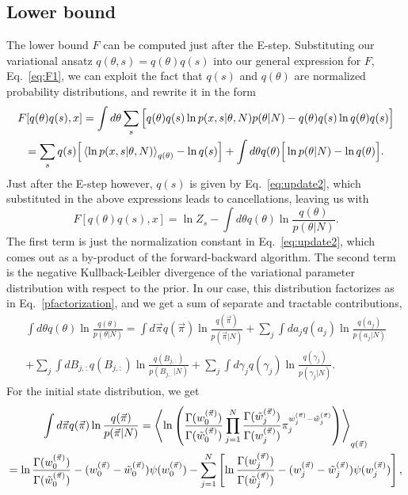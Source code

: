\subsection{Lower bound}
The lower bound $F$ can be computed just after the
E-step. Substituting our variational ansatz
$q(\theta,s)=q(\theta)q(s)$ into our general expression for $F$,
Eq.~\eqref{eq:F1}, we can exploit the fact that $q(s)$ and $q(\theta)$
are normalized probability distributions, and rewrite it in the form
\begin{multline}
F[q(\theta)q(s),x]=\int d\theta\sum_s \Big[ q(\theta)q(s) \ln
    p(x,s|\theta,N)p(\theta|N) -q(\theta)q(s) \ln q(\theta)q(s) \Big]\\
=\sum_sq(s)\Big[\left\langle \ln p(x,s|\theta,N)\right\rangle_{q(\theta)} -\ln q(s)\Big]
+\int d\theta q(\theta)\Big[\ln p(\theta|N)-\ln q(\theta)\Big].
\end{multline}
Just after the E-step however, $q(s)$ is given by
Eq.~\eqref{eq:update2}, which substituted in the above expressions
leads to cancellations, leaving us with
\begin{equation}
F[q(\theta)q(s),x]=\ln Z_s-\int d\theta q(\theta)\ln\frac{q(\theta)}{p(\theta|N)}.
\end{equation}
The first term is just the normalization constant in
Eq.~\eqref{eq:update2}, which comes out as a by-product of the
forward-backward algorithm. The second term is the negative
Kullback-Leibler divergence of the variational parameter distribution
with respect to the prior. In our case, this distribution factorizes
as in Eq.~\eqref{pfactorization}, and we get a sum of separate and
tractable contributions,
\begin{multline}
\int d\theta q(\theta)\ln\frac{q(\theta)}{p(\theta|N)}
     =\int d\vec\pi q(\vec\pi)\ln\frac{q(\vec\pi)}{p(\vec\pi|N)}
     +\sum_j\int da_j q(a_j)\ln\frac{q(a_j)}{p(a_j|N)}\\
     +\sum_j\int dB_{j,:} q(B_{j,:})\ln\frac{q(B_{j,:})}{p(B_{j,:}|N)}
     +\sum_j\int d\gamma_j q(\gamma_j)\ln\frac{q(\gamma_j)}{p(\gamma_j|N)}.
\end{multline}
For the initial state distribution, we get
\begin{multline}
  \int d\vec{\pi} q(\vec{\pi}) \ln\frac{q(\vec{\pi})}{p(\vec{\pi}|N)}
  =\left\langle \ln\left(\frac{\Gamma(w_0^{(\vec{\pi})})}{\Gamma(\tilde w_0^{(\vec{\pi})})}
    \prod_{j=1}^N\frac{\Gamma(\tilde w_j^{(\vec{\pi})})}{\Gamma(w_j^{(\vec{\pi})})}
    \pi_j^{w_j^{(\vec{\pi})}-\tilde w_j^{(\vec{\pi})}}\right)\right\rangle_{q(\vec{\pi})}\\
  =\ln\frac{\Gamma(w_0^{(\vec{\pi})})}{\Gamma(\tilde w_0^{(\vec{\pi})})}
  -(w_0^{(\vec\pi)}-\tilde w_0^{(\vec\pi)})\psi(w_0^{(\vec{\pi})})
  -\sum_{j=1}^N\left[\ln\frac{\Gamma(w_j^{(\vec{\pi})})}{\Gamma(\tilde w_j^{(\vec{\pi})})}
    -(w_j^{(\vec{\pi})}-\tilde w_j^{(\vec{\pi})})\psi(w_j^{(\vec{\pi})})\right],
\end{multline}
